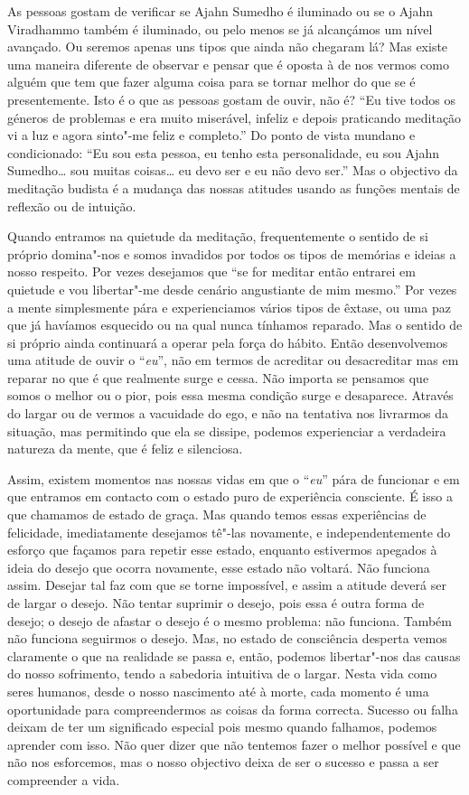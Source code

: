As pessoas gostam de verificar se Ajahn Sumedho é iluminado ou se o
Ajahn Viradhammo também é iluminado, ou pelo menos se já alcançámos um
nível avançado. Ou seremos apenas uns tipos que ainda não chegaram lá?
Mas existe uma maneira diferente de observar e pensar que é oposta à de
nos vermos como alguém que tem que fazer alguma coisa para se tornar
melhor do que se é presentemente. Isto é o que as pessoas gostam de
ouvir, não é? ``Eu tive todos os géneros de problemas e era muito
miserável, infeliz e depois praticando meditação vi a luz e agora
sinto"-me feliz e completo.'' Do ponto de vista mundano e condicionado:
``Eu sou esta pessoa, eu tenho esta personalidade, eu sou Ajahn
Sumedho\ldots{} sou muitas coisas\ldots{} eu devo ser e eu não devo ser.'' Mas o
objectivo da meditação budista é a mudança das nossas atitudes usando as
funções mentais de reflexão ou de intuição.

Quando entramos na quietude da meditação, frequentemente o sentido de si
próprio domina"-nos e somos invadidos por todos os tipos de memórias e
ideias a nosso respeito. Por vezes desejamos que ``se for meditar então
entrarei em quietude e vou libertar"-me desde cenário angustiante de mim
mesmo.'' Por vezes a mente simplesmente pára e experienciamos vários
tipos de êxtase, ou uma paz que já havíamos esquecido ou na qual nunca
tínhamos reparado. Mas o sentido de si próprio ainda continuará a operar
pela força do hábito. Então desenvolvemos uma atitude de ouvir o
``\emph{eu}'', não em termos de acreditar ou desacreditar mas em reparar no
que é que realmente surge e cessa. Não importa se pensamos que somos o
melhor ou o pior, pois essa mesma condição surge e desaparece. Através
do largar ou de vermos a vacuidade do ego, e não na tentativa nos
livrarmos da situação, mas permitindo que ela se dissipe, podemos
experienciar a verdadeira natureza da mente, que é feliz e silenciosa.

Assim, existem momentos nas nossas vidas em que o ``\emph{eu}'' pára de
funcionar e em que entramos em contacto com o estado puro de experiência
consciente. É isso a que chamamos de estado de graça. Mas quando temos
essas experiências de felicidade, imediatamente desejamos tê"-las
novamente, e independentemente do esforço que façamos para repetir esse
estado, enquanto estivermos apegados à ideia do desejo que ocorra
novamente, esse estado não voltará. Não funciona assim. Desejar tal faz
com que se torne impossível, e assim a atitude deverá ser de largar o
desejo. Não tentar suprimir o desejo, pois essa é outra forma de desejo;
o desejo de afastar o desejo é o mesmo problema: não funciona. Também
não funciona seguirmos o desejo. Mas, no estado de consciência desperta
vemos claramente o que na realidade se passa e, então, podemos
libertar"-nos das causas do nosso sofrimento, tendo a sabedoria intuitiva
de o largar. Nesta vida como seres humanos, desde o nosso nascimento até
à morte, cada momento é uma oportunidade para compreendermos as coisas
da forma correcta. Sucesso ou falha deixam de ter um significado
especial pois mesmo quando falhamos, podemos aprender com isso. Não quer
dizer que não tentemos fazer o melhor possível e que não nos esforcemos,
mas o nosso objectivo deixa de ser o sucesso e passa a ser compreender a
vida.

